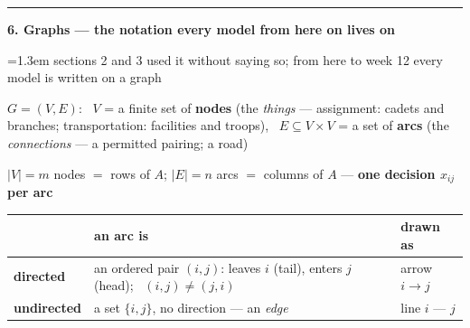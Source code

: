 \documentclass[10pt]{article}
\newcommand{\beat}[2]{%
  \par\medskip\needspace{8\baselineskip}%
  {\color{ruleink}\rule{\textwidth}{1pt}}\par\nobreak\vspace{2pt}
  {\large\bfseries #1.\; #2}\par\nobreak\vspace{3pt}}
\newenvironment{board}{%
  \par\vspace{2pt}
  \begingroup\leftskip=1.3em\relax}{%
  \par\endgroup\vspace{2pt}}
\begin{document}
\beat{6}{Graphs --- the notation every model from here on lives on}
\begin{board}
sections 2 and 3 used it without saying so; from here to week 12 every model is written on a graph
\vspace{2pt}

$G = (V, E)$: \ $V$ = a finite set of \textbf{nodes} (the \emph{things} --- assignment: cadets and branches;
transportation: facilities and troops), \
$E \subseteq V \times V$ = a set of \textbf{arcs} (the \emph{connections} --- a permitted pairing; a road)
\vspace{1pt}

\quad $|V| = m$ nodes $=$ rows of $A$; \quad $|E| = n$ arcs $=$ columns of $A$ --- \textbf{one decision $x_{ij}$ per arc}
\begin{center}
\begin{tabular}{@{}l|l|l@{}}
 & an arc is & drawn as \\ \hline
 \textbf{directed} & an ordered pair $(i,j)$: leaves $i$ (tail), enters $j$ (head); \ $(i,j) \ne (j,i)$ & arrow $i \to j$ \\[2pt]
 \textbf{undirected} & a set $\{i,j\}$, no direction --- an \emph{edge} & line $i$ --- $j$ \\
\end{tabular}
\end{center}
\end{board}
\end{document}
